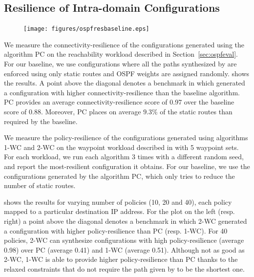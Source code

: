 \subsection{Resilience of Intra-domain Configurations} \label{sec:reseval}

\begin{figure}
	\vspace{-6mm}
		\texttt{[image: figures/ospfresbaseline.eps]}
\end{figure}

We measure the connectivity-resilience of the configurations 
generated using the algorithm PC on the reachability 
workload described in
Section~\ref{sec:ospfeval}. 
For our baseline, we use configurations 
where all the paths synthesized by \genesis
are enforced using only static routes and
OSPF weights are assigned randomly.
shows the results. A point above the diagonal 
denotes a benchmark in which \name
generated a configuration with higher connectivity-resilience than
the baseline algorithm.
PC provides an average connectivity-resilience score 
of 0.97 over the baseline score 
of 0.88.
Moreover, PC places on average 
$9.3$\% of the static routes 
than required by the baseline. 


We measure the policy-resilience of the configurations 
generated using algorithms  1-WC and 2-WC on the waypoint workload described in
 with 5 waypoint sets. 
For each workload, we run each algorithm 
3 times with a different random seed, and report the most-resilient configuration it obtains.
For our baseline, we use the configurations generated by the algorithm PC, which
only tries to reduce the number of static routes.

shows the results
for varying number of policies (10, 20 and 40), each policy mapped 
to a particular destination IP address. 
For the plot on the left (resp. right)
a point above the diagonal 
denotes a benchmark in which 2-WC
generated a configuration with higher policy-resilience than
PC (resp. 1-WC).
For 40 policies, 
2-WC can synthesize 
configurations with high policy-resilience
(average 0.98) over PC (average 0.41) and 1-WC (average 0.51). 
Although not as good as 2-WC, 1-WC is able to provide 
higher policy-resilience than
PC thanks to the relaxed constraints that do not require
the path given by \genesis to be the shortest one.

